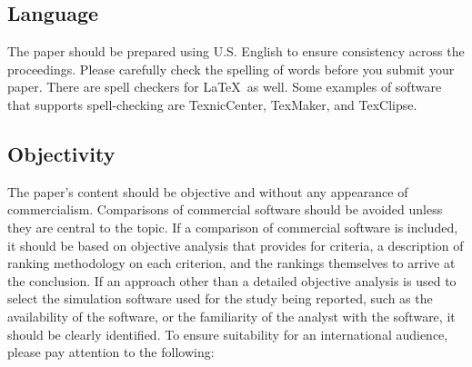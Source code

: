 \documentclass{scspaperproc}
\theoremstyle{scsthe}
\begin{document}
\subsection{Language}

The paper should be prepared using U.S. English to ensure consistency across the proceedings. Please carefully check the spelling of words before you submit your paper. There are spell checkers for \LaTeX\ as well.
Some examples of software that supports spell-checking are TexnicCenter, TexMaker, and TexClipse.

\subsection{Objectivity}
The paper's content should be objective and without any appearance of commercialism.  Comparisons of commercial software should be avoided unless they are central to the topic.  If a comparison of commercial software is included, it should be based on objective analysis that provides for criteria, a description of ranking methodology on each criterion, and the rankings themselves to arrive at the conclusion.
If an approach other than a detailed objective analysis is used to select the simulation software used for the study being reported, such as the availability of the software, or the familiarity of the analyst with the software, it should be clearly identified. To ensure suitability for an international audience, please pay attention to the following:
\end{document}
